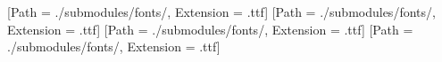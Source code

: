 








[Path = ./submodules/fonts/, Extension = .ttf]
[Path = ./submodules/fonts/, Extension = .ttf]
[Path = ./submodules/fonts/, Extension = .ttf]
\newCJKfontfamily{}[Path = ./submodules/fonts/, Extension = .ttf]




\setlength{\parindent}{2em} %
\setlength{\parskip}{0pt}   %

\usepackage{epigraph} 


\makeatletter
\renewcommand{\@makefntext}[1]{\jcz{\@thefnmark.} #1}
\makeatother
\usepackage{enumitem}



\usepackage{amsmath} %
\usepackage{amssymb} %




